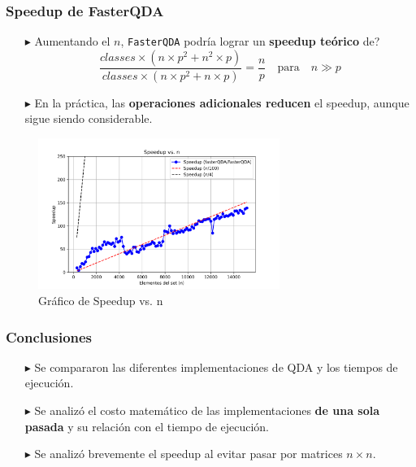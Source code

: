 \begin{frame}[fragile]
    \frametitle{Speedup de FasterQDA}
\scriptsize
    \begin{itemize}
        \item[$\blacktriangleright$]  Aumentando el \(n\), \texttt{FasterQDA} podría lograr un \textbf{speedup teórico} de?
        \[
            \frac{classes \times (n \times p^2 + n^2 \times p)}{classes \times (n \times p^2 + n \times p)} = \frac{n}{p} \quad \text{para} \quad n \gg p
        \]
        \item[$\blacktriangleright$]  En la práctica, las \textbf{operaciones adicionales reducen} el speedup, aunque sigue siendo considerable.
    \end{itemize}
    \begin{figure}
        \centering
        \includegraphics[width=0.7\textwidth]{../speedup_vs_n.png} %
        \caption{Gráfico de Speedup vs. n}
    \end{figure}
\end{frame}

\begin{frame}[fragile]
    \frametitle{Conclusiones}

    \begin{itemize}
        \item[$\blacktriangleright$] Se compararon las diferentes implementaciones de QDA y los tiempos de ejecución.
        \item[$\blacktriangleright$] Se analizó el costo matemático de las implementaciones \textbf{de una sola pasada} y su relación con el tiempo de ejecución.
        \item[$\blacktriangleright$] Se analizó brevemente el speedup al evitar pasar por matrices \(n \times n\).

    \end{itemize}

\end{frame}
